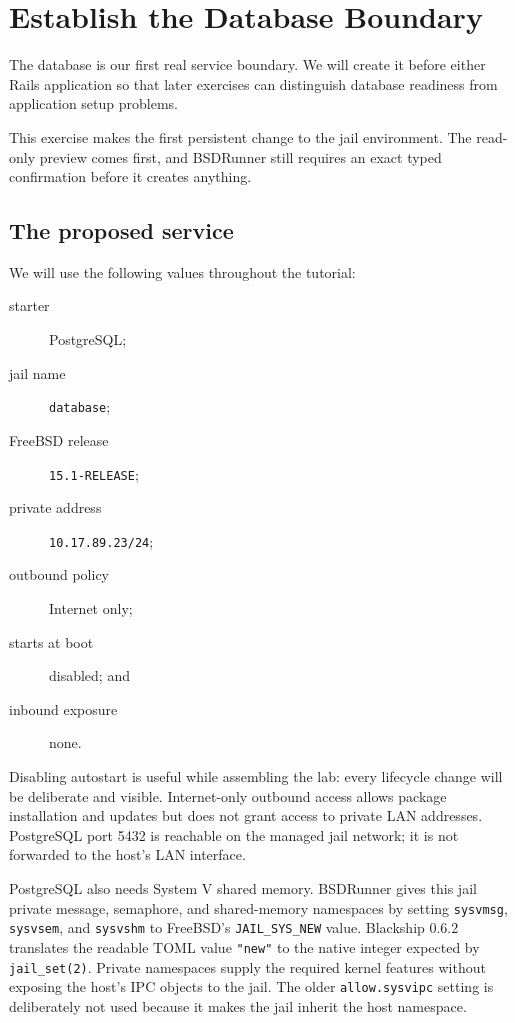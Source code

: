 \chapter{Establish the Database Boundary}

The database is our first real service boundary. We will create it before either
Rails application so that later exercises can distinguish database readiness
from application setup problems.

This exercise makes the first persistent change to the jail environment. The
read-only preview comes first, and BSDRunner still requires an exact typed
confirmation before it creates anything.

\section{The proposed service}

We will use the following values throughout the tutorial:

\begin{description}
  \item[starter] PostgreSQL;
  \item[jail name] \texttt{database};
  \item[FreeBSD release] \texttt{15.1-RELEASE};
  \item[private address] \texttt{10.17.89.23/24};
  \item[outbound policy] Internet only;
  \item[starts at boot] disabled; and
  \item[inbound exposure] none.
\end{description}

Disabling autostart is useful while assembling the lab: every lifecycle change
will be deliberate and visible. Internet-only outbound access allows package
installation and updates but does not grant access to private LAN addresses.
PostgreSQL port 5432 is reachable on the managed jail network; it is not
forwarded to the host's LAN interface.

PostgreSQL also needs System V shared memory. BSDRunner gives this jail private
message, semaphore, and shared-memory namespaces by setting
\texttt{sysvmsg}, \texttt{sysvsem}, and \texttt{sysvshm} to FreeBSD's
\texttt{JAIL\_SYS\_NEW} value. Blackship 0.6.2 translates the readable TOML
value \texttt{"new"} to the native integer expected by \texttt{jail\_set(2)}. Private
namespaces supply the required kernel features without exposing the host's IPC
objects to the jail. The older
\texttt{allow.sysvipc} setting is deliberately not used because it makes the
jail inherit the host namespace.

